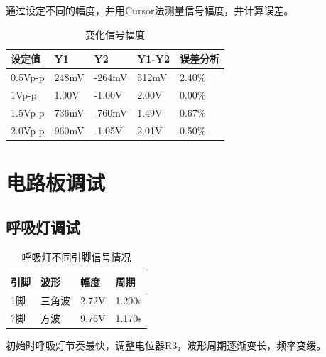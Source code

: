 \documentclass{zjureport}
\begin{document}
通过设定不同的幅度，并用Cursor法测量信号幅度，并计算误差。
\begin{table}[H]
  \centering
  \caption{变化信号幅度}
  \begin{tabular}{C{.15\textwidth}C{.15\textwidth}C{.15\textwidth}C{.15\textwidth}C{.2\textwidth}}
  \toprule
  设定值  & Y1 & Y2 & Y1-Y2 & 误差分析 \\
  \midrule
  0.5Vp-p & 248mV & -264mV & 512mV & 2.40\% \\
  1Vp-p & 1.00V & -1.00V & 2.00V & 0.00\%\\
  1.5Vp-p & 736mV & -760mV & 1.49V & 0.67\% \\
  2.0Vp-p & 960mV & -1.05V & 2.01V & 0.50\% \\
  \bottomrule
  \end{tabular}
\end{table}
\section{电路板调试}
\subsection{呼吸灯调试}
\begin{table}[H]
  \centering
  \caption{呼吸灯不同引脚信号情况}
  \begin{tabular}{C{.15\textwidth}C{.15\textwidth}C{.15\textwidth}C{.2\textwidth}}
    \toprule
  引脚 & 波形  & 幅度    & 周期     \\
  \midrule
  1脚 & 三角波 & 2.72V & 1.200s \\
  7脚 & 方波  & 9.76V & 1.170s\\
  \bottomrule
  \end{tabular}
  \end{table}
初始时呼吸灯节奏最快，调整电位器R3，波形周期逐渐变长，频率变缓。
\end{document}
